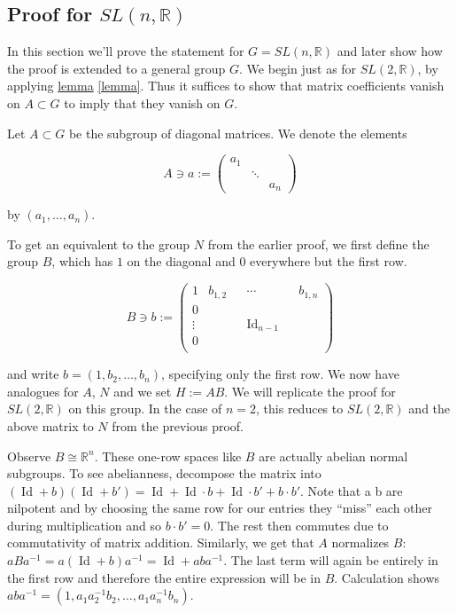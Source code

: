 \documentclass[
  12pt
]{article}
\theoremstyle{plain}
\newcommand{\G}{\ensuremath{G}\xspace}
\newcommand{\bbr}{\ensuremath{\mathbb{R}}\xspace}
\newcommand{\sltr}{\ensuremath{SL(2, \mathbb{R})}\xspace}
\newcommand{\slnr}{\ensuremath{SL(n, \mathbb{R})}\xspace}
\DeclareMathOperator{\Id}{Id}
\begin{document}

\hypertarget{proof-for-slnr}{%
  \subsection{Proof for \texorpdfstring{$SL(n, \mathbb{R})$}{SL(n, R)}}
\label{proof-for-slnr}}




  In this section we'll prove the statement for $G = \slnr$ and later show how
  the proof is extended to a general group \G. We begin just as for \sltr, by
  applying \hyperref[lemma]{lemma} \ref{lemma}. Thus it suffices to show that
  matrix coefficients vanish on $A \subset G$ to imply that they vanish on \G.

  Let $A \subset G$ be the subgroup of diagonal matrices. We denote the elements

  $$
  A \ni a := \begin{pmatrix}
    a_1 & & \\
        & \ddots & \\
        & & a_n
  \end{pmatrix}
  $$

  by $(a_1, \dots, a_n)$.

  To get an equivalent to the group $N$ from the earlier proof, we first define the group $B$, which has $1$ on the diagonal and $0$ everywhere but the first row.

  $$
    B \ni b := \begin{pmatrix}
      1 & b_{1,2} & & \cdots & & b_{1,n} \\
      0 & & &  & \\
      \vdots & & & \Id_{n-1} & \\
      0 & & & & \\
    \end{pmatrix}
  $$

  and write $b = (1, b_2, \dots, b_n)$, specifying only the first row.
  We now have analogues for $A$, $N$ and we set $H:=AB$. We will replicate the proof for \sltr on this group.
  In the case of $n = 2$, this reduces to \sltr and the above matrix to $N$ from the previous proof.

  Observe $B \cong \bbr^n$.
  These one-row spaces like $B$ are actually abelian normal subgroups.
  To see abelianness, decompose the matrix into $(\Id + b)(\Id +b') = \Id + \Id\cdot b + \Id\cdot b' + b\cdot b'$.
  Note that a b are nilpotent and by choosing the same row for our entries they
  ``miss'' each other during multiplication and so $b\cdot b' =0$. The rest then commutes
  due to commutativity of matrix addition.
  Similarly, we get that $A$ normalizes $B$: $aBa^{-1} = a(\Id + b)a^{-1} = \Id + aba^{-1}$.
  The last term will again be entirely in the first row and therefore the entire expression will be in $B$.
  Calculation shows $aba^{-1} = (1, a_1a_2^{-1}b_2, \dots, a_1a_n^{-1}b_n)$.
\end{document}
